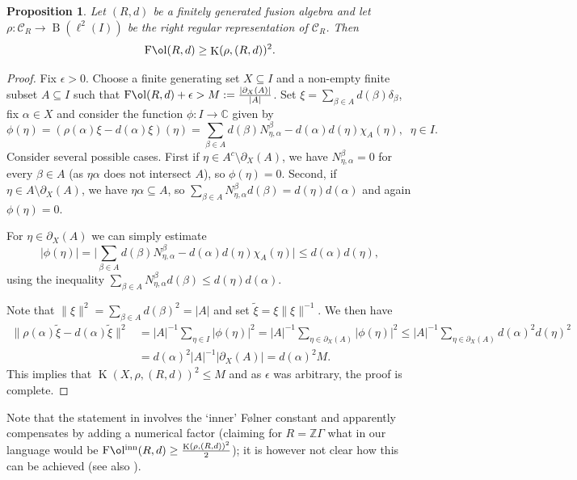 \documentclass[11 pt, leqno]{amsart}
\newcommand{\cC}{\mathcal{C}}
\DeclareMathOperator{\Fol}{F\mathrm{\o}l}
\DeclareMathOperator{\Folinn}{F\mathrm{\o}l^{inn}}
\DeclareMathOperator{\Kaz}{K}
\DeclareMathOperator{\B}{B}
\newtheorem{proposition}[theorem]{Proposition}
\theoremstyle{definition}
\numberwithin{equation}{section}
\begin{document}
\begin{proposition}\label{prop:KazhFol}
	Let $(R,d)$ be a finitely generated fusion algebra and let $\rho\colon \cC_R\to \B(\ell^2(I))$ be the right regular representation of $\cC_R$. Then 
	\[ \Fol(R,d) \geq {\Kaz(\rho,(R,d) )^2}.\]
\end{proposition}
\begin{proof}
	Fix $\epsilon>0$.
	Choose a finite generating set $X\subseteq I$ and a non-empty finite subset $A\subseteq I$ such that 
	$\Fol(R,d)+\epsilon> M:= \frac{|\partial_X(A)|}{|A|}$. Set $\xi =\sum_{\beta \in A} d(\beta) \delta_\beta$, fix $\alpha \in X$ and consider the function $\phi\colon I \to \mathbb{C}$ given by  
	\[\phi(\eta) = (\rho(\alpha) \xi - d(\alpha)\xi)(\eta) = 
	\sum_{\beta \in A}  d(\beta) N_{\eta, \alpha}^\beta  - d(\alpha) d(\eta)\chi_A(\eta), \;\; \eta \in I.\] 
	Consider several possible cases. First if $\eta \in A^c \setminus \partial_X(A)$, we have $N_{\eta,\alpha}^\beta =0$ for every $\beta \in A$ (as $\eta \alpha$ does not intersect $A$), so $\phi(\eta) =0$. Second, if $\eta \in A \setminus \partial_X (A)$, we have $\eta \alpha \subseteq A$, so 
	$\sum_{\beta \in A} N_{\eta, \alpha}^\beta d(\beta)= d(\eta) d(\alpha)$ and again $\phi(\eta) =0$.
	
	For $\eta \in \partial_X (A)$ we can simply estimate
	\[ |\phi(\eta)| = \bigl|\sum_{\beta \in A}  d(\beta) N_{\eta, \alpha}^\beta  - d(\alpha) d(\eta)\chi_A(\eta)\bigr| 
	\leq d(\alpha) d(\eta),\]
	using the inequality $\sum_{\beta \in A} N_{\eta, \alpha}^\beta d(\beta)\leq d(\eta) d(\alpha)$.
	
	Note that $\|\xi\|^2 = \sum_{\beta \in A} d(\beta)^2 = |A|$ and set $\tilde{\xi} = \xi \|\xi\|^{-1}$. We then have 
	\begin{align*} \|\rho(\alpha) \tilde\xi - d(\alpha)\tilde\xi\|^2 &= |A|^{-1} \sum_{\eta \in I} |\phi(\eta)|^2 
		= |A|^{-1} \sum_{\eta \in \partial_X (A)} |\phi(\eta)|^2  \leq |A|^{-1} \sum_{\eta \in \partial_X (A)} d(\alpha)^2 d(\eta)^2 \\ &= d(\alpha)^2 |A|^{-1} |\partial_X (A)| = d(\alpha)^2 M. \end{align*}
	This implies that $\Kaz(X,\rho,(R,d))^2 \leq M$ and as $\epsilon$ was arbitrary, the proof is complete. 
\end{proof}

Note that the statement in  \cite[Proposition 2.4]{Arzhantseva} involves the `inner' F\o lner constant and apparently compensates by adding a numerical factor (claiming for $R =\mathbb{Z}\Gamma$ what in our language would be $\Folinn (R,d) \geq \frac{{\Kaz(\rho,(R,d) )^2}}2$); it is however not clear how this can be achieved (see also \cite[Appendix A]{LPV}).
\end{document}
